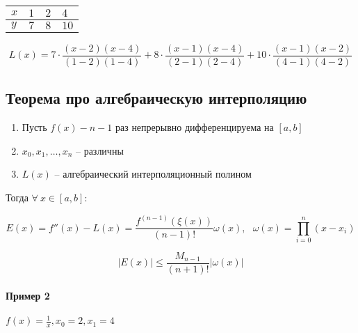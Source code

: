 \documentclass[10pt,a4paper]{article}
\begin{document}
		\begin{table}[h!]
		\centering
		\begin{tabular}{|l|l|l|l|}
		\hline
			$x$ & $1$ & $2$ & $4$ \\ \hline
			$y$ & $7$ & $8$ & $10$ \\ \hline
		\end{tabular}
		\caption{}
		\end{table}	
		
		\begin{equation}
			L\left(x\right) = 7\cdot 
			\frac{\left(x - 2\right)\left(x - 4\right)}
			{\left(1 - 2\right)\left(1 - 4\right)} + 
			8\cdot \frac{\left(x - 1\right)\left(x - 4\right)}
			{\left(2 - 1\right)\left(2 - 4\right)} +
			10\cdot \frac{\left(x - 1\right)\left(x - 2\right)}
			{\left(4 - 1\right)\left(4 - 2\right)} 
		\end{equation}
		
		\subsection{Теорема про алгебраическую интерполяцию}
		
		\begin{enumerate}
			\item Пусть $f\left(x\right) - n - 1$ раз непрерывно 
			дифференцируема на 	$\left[a, b\right]$
			\item $x_{0}, x_{1}, \ldots, x_{n}$ -- различны
			\item $L\left(x\right)$ -- алгебраический интерполяционный 
			полином
		\end{enumerate}
		
		 	Тогда $\forall \ x \in \left[a, b\right]$:
		 	
		 	\begin{equation}
		 		E\left(x\right) = f''\left(x\right) - L\left(x\right) = 
		 		\frac{f^{\left(n - 1\right)}\left(\xi\left(x\right)\right)}
		 		{\left(n - 1\right)!} \omega\left(x\right), \ \ \
		 		\omega\left(x\right) = \prod\limits_{i = 0}^{n}
		 		\left(x - x_{i}\right)
		 	\end{equation}
		 	
		 	\begin{equation}
		 		\left|E\left(x\right)\right|\leqslant \frac{M_{n - 1}}
		 		{\left(n + 1\right)!}\left|\omega\left(x\right)\right|
		 	\end{equation}
		 	
		 \paragraph*{Пример 2} $f\left(x\right) = \frac{1}{x}, 
		 x_{0} = 2, x_{1} = 4$
		 
\end{document}

